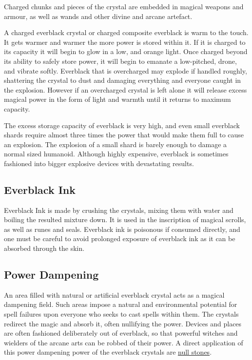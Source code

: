 Charged chunks and pieces of the crystal are embedded in magical weapons and
armour, as well as wands and other divine and arcane artefact.

A charged everblack crystal or charged composite everblack is warm to the
touch.  It gets warmer and warmer the more power is stored within it. If it is
charged to its capacity it will begin to glow in a low, and orange light. Once
charged beyond its ability to safely store power, it will begin to emanate a
low-pitched, drone, and vibrate softly. Everblack that is overcharged may
explode if handled roughly, shattering the crystal to dust and damaging
everything and everyone caught in the explosion. However if an overcharged
crystal is left alone it will release excess magical power in the form of
light and warmth until it returns to maximum capacity.

The excess storage capacity of everblack is very high, and even small
everblack shards require almost three times the power that would make them
full to cause an explosion. The explosion of a small shard is barely enough to
damage a normal sized humanoid. Although highly expensive, everblack is
sometimes fashioned into bigger explosive devices with devastating results.


\subsection{Everblack Ink}
\label{sec:Everblack Ink}

Everblack Ink is made by crushing the crystals, mixing them with water and
boiling the resulted mixture down. It is used in the inscription of magical
scrolls, as well as runes and seals. Everblack ink is poisonous if consumed
directly, and one must be careful to avoid prolonged exposure of everblack
ink as it can be absorbed through the skin.

\subsection{Power Dampening}

An area filled with natural or artificial everblack crystal acts as a magical
dampening field. Such areas impose a natural and environmental potential for
spell failures upon everyone who seeks to cast spells within them. The
crystals redirect the magic and absorb it, often nullifying the power.
Devices and places are often fashioned deliberately out of everblack, so that
powerful witches and wielders of the arcane arts can be robbed of their power.
A direct application of this power dampening power of the everblack crystals
are \hyperref[sec:Null Stone]{null stones}.

